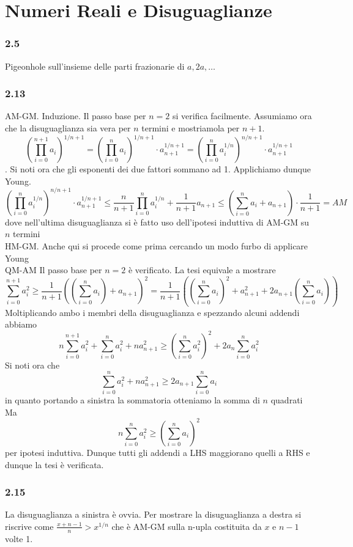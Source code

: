\documentclass[a4paper,11pt]{article}
\newcommand{\ex}[1]{\subsubsection*{#1}}
\begin{document}
\section{Numeri Reali e Disuguaglianze}
\ex{2.5} Pigeonhole sull'insieme delle parti frazionarie di $a, 2a, \ldots$
\ex{2.13}
AM-GM.
Induzione. Il passo base per $n=2$ si verifica facilmente. Assumiamo ora che la disuguaglianza sia vera per $n$ termini e mostriamola per $n+1$.
$$\left(\prod _{i=0} ^{n+1} a_i\right)^{1/n+1}=\left(\prod _{i=0} ^{n} a_i\right)^{1/n+1}\cdot a_{n+1}^{1/n+1}=\left(\prod _{i=0} ^{n} a_i^{1/n}\right)^{n/n+1}\cdot a_{n+1}^{1/n+1}$$.
Si noti ora che gli esponenti dei due fattori sommano ad 1. Applichiamo dunque Young.
$$\left(\prod _{i=0} ^{n} a_i^{1/n}\right)^{n/n+1}\cdot a_{n+1}^{1/n+1}\le \frac {n} {n+1} \prod _{i=0} ^{n} a_i^{1/n}+\frac {1} {n+1} a_{n+1}\le \left(\sum _{i=0} ^{n}a_i + a_{n+1}\right)\cdot \frac{1}{n+1}=AM$$ dove nell'ultima disuguaglianza si è fatto uso dell'ipotesi induttiva di AM-GM su $n$ termini\\
HM-GM.
Anche qui si procede come prima cercando un modo furbo di applicare Young\\
QM-AM
Il passo base per $n=2$ è verificato. La tesi equivale a mostrare $$\sum_{i=0}^{n+1}a_i^2 \ge \frac {1}{n+1}\left(\left(\sum_{i=0}^{n}a_i\right)+a_{n+1}\right)^2= \frac {1}{n+1}\left(\left(\sum_{i=0}^{n}a_i\right)^2+a_{n+1}^2+2a_{n+1}\left(\sum_{i=0}^{n}a_i\right)\right)$$
Moltiplicando ambo i membri della disuguaglianza e spezzando alcuni addendi abbiamo $$n\sum_{i=0}^{n+1}a_i^2+\sum_{i=0}^{n}a_i^2+na_{n+1}^2\ge \left(\sum_{i=0}^{n}a_i^2\right)^2+2a_{n}\sum_{i=0}^{n}a_i^2$$
Si noti ora che $$\sum_{i=0}^{n}a_i^2 +na_{n+1}^2\ge 2a_{n+1}\sum_{i=0}^{n}a_i$$ in quanto portando a sinistra la sommatoria otteniamo la somma di $n$ quadrati
Ma $$n\sum_{i=0}^{n}a_i^2\ge(\sum_{i=0}^{n}a_i)^2$$ per ipotesi induttiva. Dunque tutti gli addendi a LHS maggiorano quelli a RHS e dunque la tesi è verificata.


\ex{2.15}
La disuguaglianza a sinistra è ovvia. Per mostrare la disuguaglianza a destra si riscrive come $\frac{x+n-1}{n}>x^{1/n}$ che è AM-GM sulla n-upla costituita da $x$ e $n-1$ volte 1.
\end{document}

